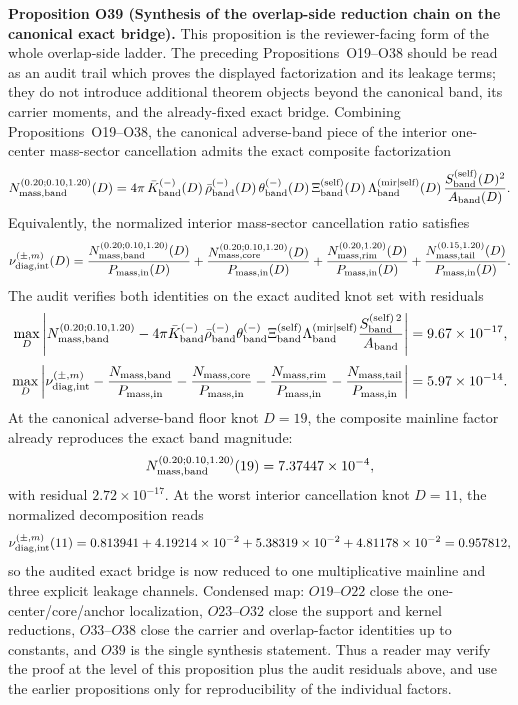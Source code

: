 \documentclass[aps,prd,onecolumn,notitlepage,nofootinbib,superscriptaddress,11pt,floatfix]{revtex4-2}
\begin{document}
\medskip\noindent\textbf{Proposition O39 (Synthesis of the overlap-side reduction chain on the canonical exact bridge).}
This proposition is the reviewer-facing form of the whole overlap-side ladder.  The preceding Propositions~O19--O38 should be read as an audit trail which proves the displayed factorization and its leakage terms; they do not introduce additional theorem objects beyond the canonical band, its carrier moments, and the already-fixed exact bridge.
Combining Propositions~O19--O38, the canonical adverse-band piece of the interior one-center mass-sector cancellation admits the exact composite factorization
\[
N_{\rm mass,band}^{(0.20;0.10,1.20)}(D)
=
4\pi\,
\bar K_{\rm band}^{(-)}(D)\,
\bar\rho_{\rm band}^{(-)}(D)\,
\theta_{\rm band}^{(-)}(D)\,
\Xi_{\rm band}^{\rm(self)}(D)\,
\Lambda_{\rm band}^{\rm(mir|self)}(D)\,
\frac{S_{\rm band}^{\rm(self)}(D)^2}{A_{\rm band}(D)}.
\]
Equivalently, the normalized interior mass-sector cancellation ratio satisfies
\[
\nu_{\rm diag,int}^{(\pm,m)}(D)
=
\frac{N_{\rm mass,band}^{(0.20;0.10,1.20)}(D)}{P_{\rm mass,in}(D)}
+
\frac{N_{\rm mass,core}^{(0.20;0.10,1.20)}(D)}{P_{\rm mass,in}(D)}
+
\frac{N_{\rm mass,rim}^{(0.20,1.20)}(D)}{P_{\rm mass,in}(D)}
+
\frac{N_{\rm mass,tail}^{(0.15,1.20)}(D)}{P_{\rm mass,in}(D)}.
\]
The audit
verifies both identities on the exact audited knot set with residuals
\[
\max_D\left|
N_{\rm mass,band}^{(0.20;0.10,1.20)}
-
4\pi\bar K_{\rm band}^{(-)}\bar\rho_{\rm band}^{(-)}\theta_{\rm band}^{(-)}
\Xi_{\rm band}^{\rm(self)}\Lambda_{\rm band}^{\rm(mir|self)}
\frac{S_{\rm band}^{\rm(self)\,2}}{A_{\rm band}}
\right|
=
9.67\times10^{-17},
\]
\[
\max_D\left|
\nu_{\rm diag,int}^{(\pm,m)}
-
\frac{N_{\rm mass,band}}{P_{\rm mass,in}}
-
\frac{N_{\rm mass,core}}{P_{\rm mass,in}}
-
\frac{N_{\rm mass,rim}}{P_{\rm mass,in}}
-
\frac{N_{\rm mass,tail}}{P_{\rm mass,in}}
\right|
=
5.97\times10^{-14}.
\]
At the canonical adverse-band floor knot \(D=19\), the composite mainline factor already reproduces the exact band magnitude:
\[
N_{\rm mass,band}^{(0.20;0.10,1.20)}(19)
=
7.37447\times10^{-4},
\]
with residual \(2.72\times10^{-17}\). At the worst interior cancellation knot \(D=11\), the normalized decomposition reads
\[
\nu_{\rm diag,int}^{(\pm,m)}(11)
=
0.813941
+
4.19214\times10^{-2}
+
5.38319\times10^{-2}
+
4.81178\times10^{-2}
=
0.957812,
\]
so the audited exact bridge is now reduced to one multiplicative mainline and three explicit leakage channels.
Condensed map: \(O19\text{--}O22\) close the one-center/core/anchor localization, \(O23\text{--}O32\) close the support and kernel reductions, \(O33\text{--}O38\) close the carrier and overlap-factor identities up to constants, and \(O39\) is the single synthesis statement.  Thus a reader may verify the proof at the level of this proposition plus the audit residuals above, and use the earlier propositions only for reproducibility of the individual factors.
\end{document}
